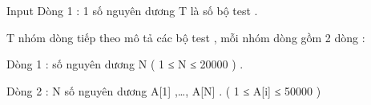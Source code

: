 Input
Dòng 1 : 1 số nguyên dương T là số bộ test .   


   T nhóm dòng tiếp theo mô tả các bộ test , mỗi nhóm dòng gồm 2 dòng :   


   Dòng 1 : số nguyên dương N  ( 1 ≤ N ≤ 20000 )  .   


   Dòng 2 : N số nguyên dương A[1] ,…, A[N] . ( 1 ≤ A[i] ≤ 50000 )